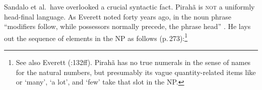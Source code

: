 \documentclass[output=paper,colorlinks,citecolor=brown
]{langscibook}
\begin{document}
\noindent
\hspace*{1.5em}
\hspace*{2em}

\noindent
Sandalo et al.\ have overlooked a crucial syntactic fact. Pirah{\~a} is
\textsc{not} a uniformly head-final language. As Everett noted forty
years ago, in the noun phrase ``modifiers follow, while possessors normally
precede, the phrase head'' \citep[272]{Everett86HAL}. He lays out
the sequence of elements in the NP as follows (p.\,273):\footnote{%
   See also Everett (\citeyear{Everett83}:132ff). Pirah{\~a} has no true
   numerals in the sense of names for the natural numbers, but presumably
   its vague quantity-related items like  or
    `many',
    `a lot', and
    `few' take that slot in the NP.}
\end{document}
